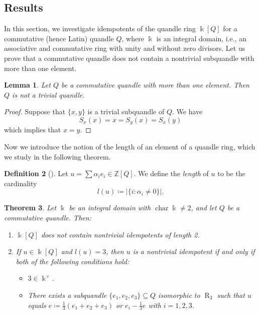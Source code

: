 \documentclass[12 pt]{amsart}
\newtheorem{theorem}{Theorem}[section]
\newtheorem{lemma}[theorem]{Lemma}
\theoremstyle{definition}
\newtheorem{definition}[theorem]{Definition}
\theoremstyle{remark}
\numberwithin{equation}{section}
\newcommand{\R}{\operatorname{R}}
\renewcommand{\k}{\Bbbk}
\newcommand{\chara}{\operatorname{char}}
\begin{document}
\subsection{Results}
In this section, we investigate idempotents of the quandle ring $\k[Q]$ for a commutative (hence Latin) quandle $Q$, where $\k$ is an integral domain, i.e., an associative and commutative ring with unity and without zero divisors. Let us prove that a commutative quandle does not contain a nontrivial subquandle with more than one element.
\begin{lemma}
\label{pro2.1}
Let $Q$ be a commutative quandle with more than one element. Then $Q$ is not a trivial quandle.
\end{lemma}
\begin{proof}
    Suppose that $\{x,y\}$ is a trivial subquandle of $Q$. We have $$S_x(x)=x=S_y(x)=S_x(y)$$ which implies that $x=y$.
\end{proof}
Now we introduce the notion of the length of an element of a quandle ring, which we study in the following theorem.
\begin{definition}[{\cite[Def.\ 2.6]{NP}}]
    Let $u=\sum\alpha_i e_i\in \mathbb{Z}[Q]$. We define the \emph{length} of $u$ to be the cardinality \[l(u)\coloneq|\{i: \alpha_i\neq 0\}|.\]
\end{definition} 
\begin{theorem}\label{Theorem 4.6}
   Let $\k$ be an integral domain with $\chara\k\neq 2$, and let $Q$ be a commutative quandle. Then:
   \begin{enumerate}
       \item $\k[Q]$ does not contain nontrivial idempotents of length 2. 
       \item If $u\in\k[Q]$ and $l(u)=3$, then $u$ is a nontrivial idempotent if and only if both of the following conditions hold:
       \begin{itemize}
           \item $3\in\k^\times$.
           \item There exists a subquandle $\{e_1,e_2,e_3\}\subseteq Q$ isomorphic to $\R_3$ such that $u$ equals $e\coloneq\frac{1}{3}(e_1+e_2+e_3)$ or $e_i-\frac{1}{3}e$ with $i=1,2,3$.
       \end{itemize}
   \end{enumerate}
   
\end{theorem}
\end{document}
